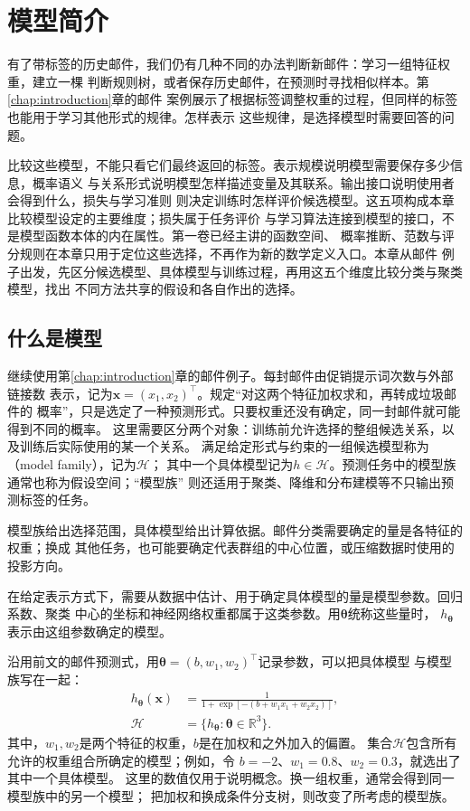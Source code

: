 \chapter{模型简介}
\label{chap:machine-learning-models}

有了带标签的历史邮件，我们仍有几种不同的办法判断新邮件：学习一组特征权重，建立一棵
判断规则树，或者保存历史邮件，在预测时寻找相似样本。第\ref{chap:introduction}章的邮件
案例展示了根据标签调整权重的过程，但同样的标签也能用于学习其他形式的规律。怎样表示
这些规律，是选择模型时需要回答的问题。

比较这些模型，不能只看它们最终返回的标签。表示规模说明模型需要保存多少信息，概率语义
与关系形式说明模型怎样描述变量及其联系。输出接口说明使用者会得到什么，损失与学习准则
则决定训练时怎样评价候选模型。这五项构成本章比较模型设定的主要维度；损失属于任务评价
与学习算法连接到模型的接口，不是模型函数本体的内在属性。第一卷已经主讲的函数空间、
概率推断、范数与评分规则在本章只用于定位这些选择，不再作为新的数学定义入口。本章从邮件
例子出发，先区分候选模型、具体模型与训练过程，再用这五个维度比较分类与聚类模型，找出
不同方法共享的假设和各自作出的选择。

\section{什么是模型}
\label{sec:models-meaning}

继续使用第\ref{chap:introduction}章的邮件例子。每封邮件由促销提示词次数与外部链接数
表示，记为$\bm{x}=(x_1,x_2)^{\top}$。规定“对这两个特征加权求和，再转成垃圾邮件的
概率”，只是选定了一种预测形式。只要权重还没有确定，同一封邮件就可能得到不同的概率。
这里需要区分两个对象：训练前允许选择的整组候选关系，以及训练后实际使用的某一个关系。
满足给定形式与约束的一组候选模型称为（model family），记为$\mathcal H$；
其中一个具体模型记为$h\in\mathcal H$。预测任务中的模型族通常也称为假设空间；“模型族”
则还适用于聚类、降维和分布建模等不只输出预测标签的任务。

模型族给出选择范围，具体模型给出计算依据。邮件分类需要确定的量是各特征的权重；换成
其他任务，也可能要确定代表群组的中心位置，或压缩数据时使用的投影方向。

在给定表示方式下，需要从数据中估计、用于确定具体模型的量是模型参数。回归系数、聚类
中心的坐标和神经网络权重都属于这类参数。用$\bm{\theta}$统称这些量时，
$h_{\bm{\theta}}$表示由这组参数确定的模型。

沿用前文的邮件预测式，用$\bm{\theta}=(b,w_1,w_2)^{\top}$记录参数，可以把具体模型
与模型族写在一起：
\begin{equation}
  \begin{aligned}
    h_{\bm{\theta}}(\bm{x})
      &=\frac{1}{1+\exp[-(b+w_1x_1+w_2x_2)]},\\
    \mathcal{H}&=\{h_{\bm{\theta}}:\bm{\theta}\in\mathbb{R}^{3}\}.
  \end{aligned}
  \label{eq:models-family-example}
\end{equation}
其中，$w_1,w_2$是两个特征的权重，$b$是在加权和之外加入的偏置。
集合$\mathcal{H}$包含所有允许的权重组合所确定的模型；例如，令
$b=-2$、$w_1=0.8$、$w_2=0.3$，就选出了其中一个具体模型。
这里的数值仅用于说明概念。换一组权重，通常会得到同一模型族中的另一个模型；
把加权和换成条件分支树，则改变了所考虑的模型族。

